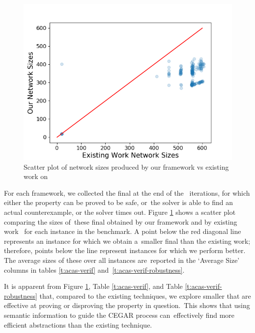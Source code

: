 \begin{figure}
    \vspace*{-0.5cm}
    \includegraphics[scale=0.4]{figs/scatter-cegar-our-nerualsat-diag-new.png}
    \vspace{0.15cm}
    \caption{Scatter plot of network sizes produced by our framework vs existing
    work \cite{cegar-nn} on \acasxu }
    \label{f:scatter-netsizes}
    \vspace*{-0.5cm}
\end{figure}

For each framework, we collected the final \abs at the end of the \cegar iterations, for which either the property can be proved to be safe, or the solver is able to find an actual counterexample, or the solver times out. Figure \ref{f:scatter-netsizes} shows a scatter plot comparing the sizes of these final \abs obtained by our framework and by existing work \cite{cegar-nn} for each instance in the benchmark.
A point below the red diagonal line represents an instance for which we obtain a smaller final \abs than the existing work; therefore, points below the line represent instances for which we perform better.
The average sizes of these \abs over all instances are reported in the `Average Size' columns in tables \ref{t:acas-verif} and \ref{t:acas-verif-robustness}.

It is apparent from Figure \ref{f:scatter-netsizes}, Table \ref{t:acas-verif}, and Table \ref{t:acas-verif-robustness} that, compared to the existing techniques, we explore smaller \abs that are effective at proving or disproving the property in question. This shows that using semantic information to guide the CEGAR process can effectively find more efficient abstractions than the existing technique.


